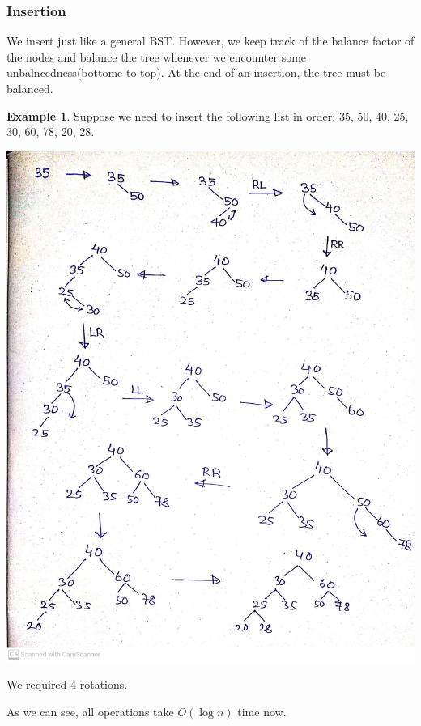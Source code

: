 \documentclass[10pt, a4paper]{extarticle}
\theoremstyle{definition}
\newtheorem{eg}{Example}
\begin{document}
		\subsubsection{Insertion}
		We insert just like a general BST. However, we keep track of the balance factor of the nodes and balance the tree whenever we encounter some unbalncedness(bottome to top). At the end of an insertion, the tree must be balanced.
		\begin{eg}
			Suppose we need to insert the following list in order: 35, 50, 40, 25, 30, 60, 78, 20, 28.
		\begin{center}
			\includegraphics[scale=0.15]{avl-insertion.jpg}\\
		\end{center}
		We required 4 rotations.
		\end{eg}

		As we can see, all operations take $O(\log n)$ time now.
\end{document}

